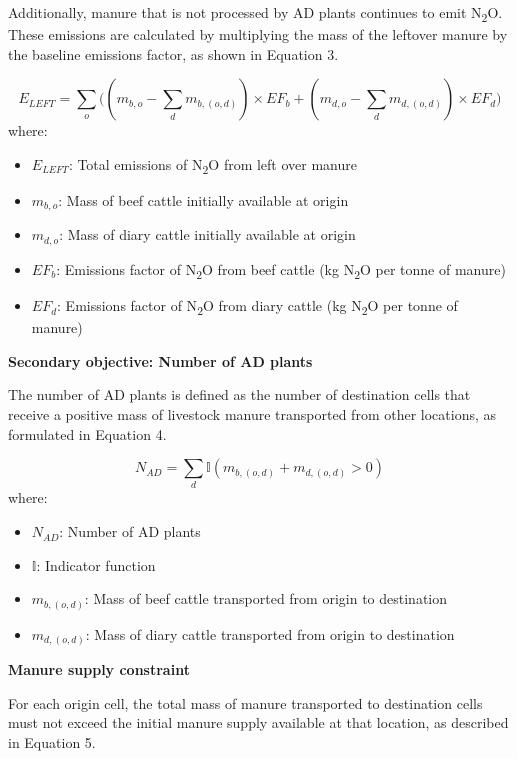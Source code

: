 \documentclass[12pt]{article}
\begin{document}
Additionally, manure that is not processed by AD plants continues to emit N\textsubscript{2}O. These emissions are calculated by multiplying the mass of the leftover manure by the baseline emissions factor, as shown in Equation 3.

\begin{equation}
  E_{LEFT} = \sum_o\biggl((m_{b,o} - \sum_d m_{b, (o, d)}) \times EF_{b} + (m_{d,o} - \sum_d m_{d, (o, d)}) \times EF_d \biggr)
\end{equation}
where:
\begin{itemize}
  \item $E_{LEFT}$: Total emissions of N\textsubscript{2}O from left over manure
  \item $m_{b,o}$: Mass of beef cattle initially available at origin
  \item $m_{d,o}$: Mass of diary cattle initially available at origin
  \item $EF_b$: Emissions factor of N\textsubscript{2}O from beef cattle (kg N\textsubscript{2}O per tonne of manure)
  \item $EF_d$: Emissions factor of N\textsubscript{2}O from diary cattle (kg N\textsubscript{2}O per tonne of manure)
\end{itemize}

\vspace{10pt}
\textbf{Secondary objective: Number of AD plants}

The number of AD plants is defined as the number of destination cells that receive a positive mass of livestock manure transported from other locations, as formulated in Equation 4.

\begin{equation}
  N_{AD} = \sum_d \mathbb{I}(m_{b, (o, d)} + m_{d, (o, d)} > 0)
\end{equation}
where:
\begin{itemize}
  \item $N_{AD}$: Number of AD plants
  \item $\mathbb{I}$: Indicator function
  \item $m_{b, (o, d)}$: Mass of beef cattle transported from origin to destination
  \item $m_{d, (o, d)}$: Mass of diary cattle transported from origin to destination
\end{itemize}

\vspace{10pt}
\textbf{Manure supply constraint}

For each origin cell, the total mass of manure transported to destination cells must not exceed the initial manure supply available at that location, as described in Equation 5.
\end{document}
